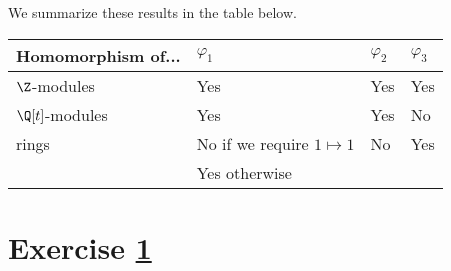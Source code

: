 {We summarize these results in the table below.
\begin{center}
\begin{tabular}{l l l l}
\hline\hline
Homomorphism of...	&	$\varphi_{1}$	&	$\varphi_{2}$	&	$\varphi_{3}$	\\
\hline
$\Z$-modules			&	Yes					&	Yes					&	Yes					\\
$\Q[t]$-modules		&	Yes					&	Yes					&	No					\\
rings							&	No if we require $1 \mapsto 1$	&	No	&	Yes			\\
								&	Yes otherwise	&							&							\\
\hline
\end{tabular}
\end{center}}%



\section{Exercise \ref{sec : e03q4}}
\label{sec : e03q4}

